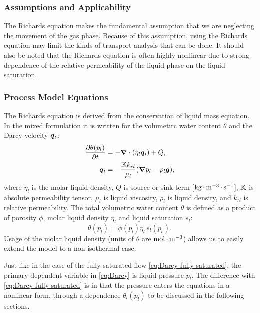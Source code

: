 \subsubsection{Assumptions and Applicability}

The Richards equation makes the fundamental assumption that we are neglecting
the movement of the gas phase.
Because of this assumption, using the Richards equation may limit the kinds of 
transport analysis that can be done.
It should also be noted that the Richards equation is often highly nonlinear
due to strong dependence of the relative permeability of the liquid phase
on the liquid saturation.


\subsubsection{Process Model Equations} 
\label{sec:richards-model-equations}

The Richards equation is derived from the conservation of
liquid mass equation.
In the mixed formulation it is written
for the volumetirc water content $\theta$ and the Darcy velocity ${\boldsymbol{q}}_l$:  
\begin{subequations}\label{eq:Darcy}
\begin{align}
  \frac{\partial \theta(p_l)}{\partial t} 
  &= 
  -{\boldsymbol{\nabla}} \cdot (\eta_l {\boldsymbol{q}}_l) + Q,
  \\
  {\boldsymbol{q}}_l 
  &= 
  -\frac{{\mathbb K} k_{rl}}{\mu_l} ({\boldsymbol{\nabla}} p_l - \rho_l {\boldsymbol{g}}),
\end{align}
\end{subequations}
where 
$\eta_l$ is the molar liquid density,
$Q$ is source or sink term [${\rm kg} {\,\cdot\,} {\rm m}^{-3} {\,\cdot\,} {\rm s}^{-1}$],
${\mathbb K}$ is absolute permeability tensor,
$\mu_l$ is liquid viscosity,
$\rho_l$ is liquid density, and
$k_{rl}$ is relative permeability.
The total volumetric water content $\theta$ is defined as
a product of porosity $\phi$, molar liquid density $\eta_l$ and liquid saturation $s_l$:
$$
  \theta(p_l) = \phi(p_l) \eta_l\, s_l(p_c).
$$
Usage of the molar liquid density (units of $\theta$ are ${\rm mol}{\,\cdot\,}{\rm m}^{-3}$)
allows us to easily extend the model to a non-isothermal case.

Just like in the case of the fully saturated flow \eqref{eq:Darcy fully saturated},
the primary dependent variable in \eqref{eq:Darcy} is liquid pressure $p_l$.
The difference with \eqref{eq:Darcy fully saturated}
is in that the pressure enters the equations in a nonlinear form,
through a dependence $\theta_l(p_l)$ to be discussed in the following sections.

